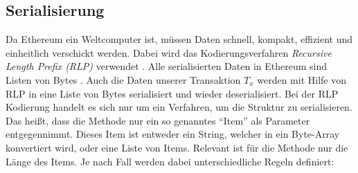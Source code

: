 \documentclass[runningheads]{llncs}
\begin{document}
\subsection{Serialisierung}
Da Ethereum ein Weltcomputer ist, müssen Daten schnell, kompakt, effizient und einheitlich verschickt werden. Dabei wird das Kodierungsverfahren \textit{Recursive Length Prefix (RLP)} verwendet \cite[S. 100]{antonopoulos_mastering_2019}. Alle serialisierten Daten in Ethereum sind Listen von Bytes \cite[S. 3]{wood_ethereum/yellowpaper_2019}. Auch die Daten unserer Transaktion $ T_x $ werden mit Hilfe von RLP in eine Liste von Bytes serialisiert und wieder deserialisiert. Bei der RLP Kodierung handelt es sich nur um ein Verfahren, um die Struktur zu serialisieren. Das heißt, dass die Methode nur ein so genanntes "`Item"' als Parameter entgegennimmt. Dieses Item ist entweder ein String, welcher in ein Byte-Array konvertiert wird, oder eine Liste von Items. Relevant ist für die Methode nur die Länge des Items. Je nach Fall werden dabei unterschiedliche Regeln definiert:
\end{document}
